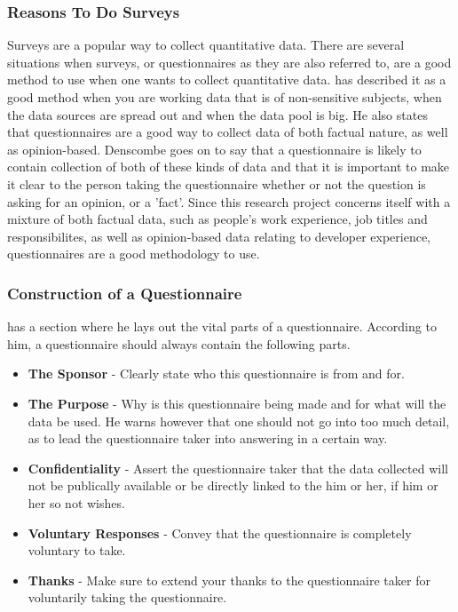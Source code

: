 \documentclass{article}
\begin{document}
\subsubsection{Reasons To Do Surveys}
Surveys are a popular way to collect quantitative data.
There are several situations when surveys, or questionnaires as they are also referred to, are a good
method to use when one wants to collect quantitative data. \cite{denscombe} has described it as a good method when you are
working data that is of non-sensitive subjects, when the data sources are spread out and when the data pool is big.
He also states that questionnaires are a good way to collect data of both factual nature, as well as opinion-based.
Denscombe goes on to say that a questionnaire is likely to contain collection of both of these kinds of data and that it is
important to make it clear to the person taking the questionnaire whether or not the question is asking for an opinion, or a 'fact'.
Since this research project concerns itself with a mixture of both factual data, such as people's work experience, job titles and responsibilites, as well as opinion-based data relating to developer experience, questionnaires are a good methodology to use.

\subsubsection{Construction of a Questionnaire}
\cite{denscombe} has a section where he lays out the vital parts of a questionnaire. According to him, a questionnaire should always contain the following parts.

\begin{itemize}
\item \textbf{The Sponsor} - Clearly state who this questionnaire is from and for.
\item \textbf{The Purpose} - Why is this questionnaire being made and for what will the data be used. He warns however that one should not go into too much detail, as to lead the questionnaire taker into answering in a certain way.
\item \textbf{Confidentiality} - Assert the questionnaire taker that the data collected will not be publically available or be directly linked to the him or her, if him or her so not wishes.
\item \textbf{Voluntary Responses} - Convey that the questionnaire is completely voluntary to take.
\item \textbf{Thanks} - Make sure to extend your thanks to the questionnaire taker for voluntarily taking the questionnaire.
\end{itemize}
\end{document}
